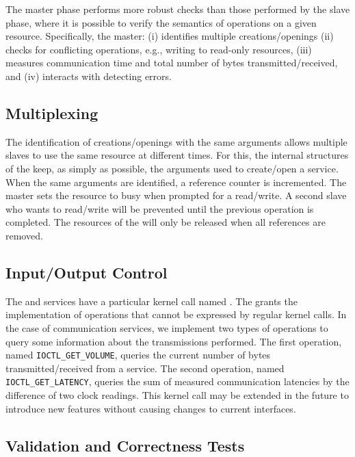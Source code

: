 			The master phase performs more robust checks than those performed
			by the slave phase, where it is possible to verify the semantics
			of operations on a given resource. Specifically, the master:
			(i) identifies multiple creations/openings
			(ii) checks for conflicting operations, e.g., writing to read-only resources,
			(iii) measures communication time and total number of bytes transmitted/received, and
			(iv) interacts with \nanvixhal detecting errors.

		\subsection{Multiplexing}

			The identification of creations/openings with the same arguments
			allows multiple slaves to use the same resource at different times.
			For this, the internal structures of the \os keep, as simply as possible,
			the arguments used to create/open a service. When the same arguments are
			identified, a reference counter is incremented. The master sets the resource
			to busy when prompted for a read/write. A second slave who wants to read/write
			 will be prevented until the previous operation is completed. The resources
			 of the \hal will only be released when all references are removed.

		\subsection{Input/Output Control}

			The \mailbox and \portal services have a particular kernel
			call named
			\ioctl. The \ioctl grants the implementation of operations that cannot be
			expressed by regular kernel calls. In the case of communication services,
			we implement two types of operations to query some
			information about the
			transmissions performed. The first operation, named \texttt{IOCTL\_GET\_VOLUME},
			queries the current number of bytes transmitted/received from a service.
			The second operation, named \texttt{IOCTL\_GET\_LATENCY}, queries the sum
			of measured communication latencies by the difference of two clock readings.
			This kernel call may be extended in the future to introduce new features
			without causing changes to current interfaces.

		\subsection{Validation and Correctness Tests}

